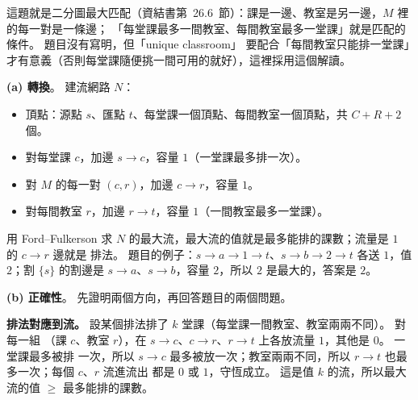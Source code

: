 \begin{pastsoln}
這題就是二分圖最大匹配（資結書第~26.6~節）：課是一邊、教室是另一邊，$M$ 裡的每一對是一條邊；
「每堂課最多一間教室、每間教室最多一堂課」就是匹配的條件。 題目沒有寫明，但「unique classroom」
要配合「每間教室只能排一堂課」才有意義（否則每堂課隨便挑一間可用的就好），這裡採用這個解讀。

\textbf{(a) 轉換}。 建流網路 $N$：
\begin{itemize}
\item 頂點：源點 $s$、匯點 $t$、每堂課一個頂點、每間教室一個頂點，共 $C + R + 2$ 個。
\item 對每堂課 $c$，加邊 $s \to c$，容量 $1$（一堂課最多排一次）。
\item 對 $M$ 的每一對 $(c, r)$，加邊 $c \to r$，容量 $1$。
\item 對每間教室 $r$，加邊 $r \to t$，容量 $1$（一間教室最多一堂課）。
\end{itemize}
用 Ford--Fulkerson 求 $N$ 的最大流，最大流的值就是最多能排的課數；流量是 $1$ 的 $c \to r$ 邊就是
排法。 題目的例子：$s \to a \to 1 \to t$、$s \to b \to 2 \to t$ 各送 $1$，值 $2$；割 $\{s\}$ 的割邊是
$s \to a$、$s \to b$，容量 $2$，所以 $2$ 是最大的，答案是 $2$。

\begin{center}
\end{center}

\textbf{(b) 正確性}。 先證明兩個方向，再回答題目的兩個問題。

\textbf{排法對應到流。} 設某個排法排了 $k$ 堂課（每堂課一間教室、教室兩兩不同）。 對每一組
（課 $c$、教室 $r$），在 $s \to c$、$c \to r$、$r \to t$ 上各放流量 $1$，其他是 $0$。 一堂課最多被排
一次，所以 $s \to c$ 最多被放一次；教室兩兩不同，所以 $r \to t$ 也最多一次；每個 $c$、$r$ 流進流出
都是 $0$ 或 $1$，守恆成立。 這是值 $k$ 的流，所以最大流的值 $\ge$ 最多能排的課數。


\end{pastsoln}
